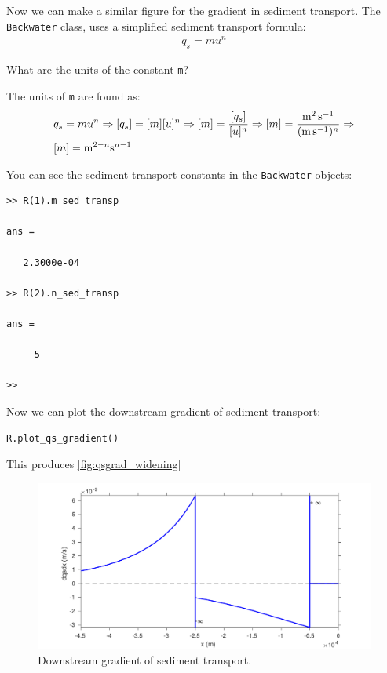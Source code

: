 \documentclass[a4paper]{article}
\begin{document}
Now we can make a similar figure for the gradient in sediment transport. The \lstinline{Backwater} class, uses a simplified sediment transport formula:
\begin{align*}
  q_s=mu^n
\end{align*}
\begin{exercise}
  What are the units of the constant \lstinline{m}?
\end{exercise}

\begin{solution}
  The units of \lstinline{m} are found as:
  \begin{align*}
      &q_s=mu^n \Rightarrow [q_s]=[m][u]^n \Rightarrow [m]=\dfrac{[q_s]}{[u]^n} \Rightarrow [m]=\dfrac{\si{\m\squared\per\s}}{(\si{\m\per\s})^n}\Rightarrow\\
      &[m]=\si{m\tothe{2-n}\s\tothe{n-1}}
  \end{align*}
\end{solution}

You can see the sediment transport constants in the \lstinline{Backwater} objects:
\begin{lstlisting}
>> R(1).m_sed_transp

ans =

   2.3000e-04

>> R(2).n_sed_transp

ans =

     5

>> 
\end{lstlisting}

Now we can plot the downstream gradient of sediment transport:

\begin{lstlisting}
R.plot_qs_gradient()
\end{lstlisting}

This produces \autoref{fig:qsgrad_widening}

\begin{figure}[ht]
  \centering
  \includegraphics[width=\linewidth]{matlab/qsgrad_widening.pdf}
  \caption{Downstream gradient of sediment transport.}
  \label{fig:qsgrad_widening}
\end{figure}
\end{document}
